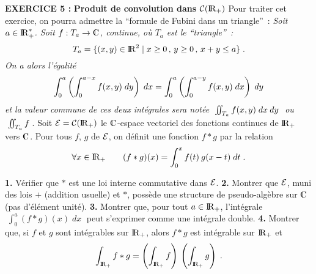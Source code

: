 \documentclass{article}
\begin{document}
{\bf EXERCICE 5 :}\msk
{\bf Produit de convolution dans} ${\cal C}({\rm I\kern-0.6mm R}_+)$\msk
Pour traiter cet exercice, on pourra admettre la ``formule de Fubini dans un triangle''~:\ssk\new
{\it Soit $a\in{\rm I\kern-0.6mm R}_+^*$. Soit $f:T_a\vers\cmat$, continue, o\`u $T_a$ est le ``triangle''~:
\vv
$$T_a=\{(x,y)\in{\rm I\kern-0.6mm R}^2\;|\;x\ge0\,,\,y\ge0\,,\,x+y\le a\}\;.$$
On a alors l'\'egalit\'e\vv
$$\int_0^a\left(\int_0^{a-x}f(x,y)\;dy\right)\;dx=\int_0^a\left(\int_0^{a-y}f(x,y)\;
  dx\right)\;dy$$
et la valeur commune de ces deux int\'egrales sera not\'ee $\;\int\!\!\!\int_{T_a}f(x,y)
\;dx\>dy\;$ ou $\;\int\!\!\!\int_{T_a}f\;$}.\msk
Soit ${\cal E}={\cal C}({\rm I\kern-0.6mm R}_+)$ le $\cmat$-espace vectoriel des fonctions
continues de ${\rm I\kern-0.6mm R}_+$ vers $\cmat$. Pour tous $f$, $g$ de ${\cal E}$, on
d\'efinit une fonction $f*g$ par la relation\vv
$$\forall x\in{\rm I\kern-0.6mm R}_+\qquad (f*g)(x)=\int_0^x f(t)\>g(x-t)\;dt\;.$$\par
{\bf 1.} V\'erifier que $*$ est une loi interne commutative dans ${\cal E}$.\msk
{\bf 2.} Montrer que ${\cal E}$, muni des lois $+$ (addition usuelle) et $*$,
poss\`ede une
structure de pseudo-alg\`ebre sur $\cmat$ (pas d'\'el\'ement unit\'e).\ssk
{\bf 3.} Montrer que, pour tout $a\in{\rm I\kern-0.6mm R}_+$, l'int\'egrale $\;\int_0^a(f*g)(x)
\;dx\;$ peut s'exprimer comme une int\'egrale double.\ssk
{\bf 4.} Montrer que, si $f$ et $g$ sont int\'egrables sur ${\rm I\kern-0.6mm R}_+$, alors
$f*g$ est int\'egrable sur ${\rm I\kern-0.6mm R}_+$ et\vv
$$\int_{{\rm I\kern-0.6mm R}_+}f*g=\left(\int_{{\rm I\kern-0.6mm R}_+}f\right)\>\left(\int_{{\rm I\kern-0.6mm R}_+}g\right)\;.$$

\msk
\cl{- - - - - - - - - - - - - - - - - - - - - - - - - - - - - -}
\msk
\end{document}
